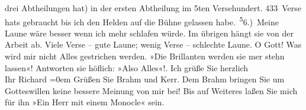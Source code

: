 \begin{ledgroupsized}[t]{13cm}
               drei Abtheilungen hat) in der ersten Abtheilung im 5ten Versehundert. 433 Verse hats gebraucht bis ich den Helden
               auf die Bühne gelassen habe. \substVorne{}\textsuperscript{5}\substDazwischen{}6\substHinten{}.) Meine Laune wäre besser {\pb}wenn ich mehr schlafen würde. Im übrigen hängt sie von der Arbeit ab. Viele Verse –
               gute Laune; wenig Verse – schlechte Laune. O Gott! Was wird mir nicht Alles
               gestrichen werden. »Die Brillanten werden sie mer stehn lassen«! Antworten sie
               höflich: »Also Alles«!.\pend
           \pstart
            Ich grüße Sie herzlich{\\[\baselineskip]}Ihr \spacefill\mbox{Richard}\pend
           \leftskip=0em{}\pstart
           \noindent{}Grüßen Sie Brahm und Kerr. Dem Brahm bringen Sie um Gotteswillen keine bessere
                  Meinung von mir bei! Bis auf Weiteres laßen Sie mich für ihn »Ein Herr mit einem
                  Monocle« sein.\pend
           \endnumbering{}\end{ledgroupsized}  \newcommand{\dateiname}{L00988}\newcommand{\titel}{Richard Beer-Hofmann an Arthur Schnitzler, 3. 10. 1899}\newcommand{\editorInnen}{Martin Anton Müller und Gerd-Hermann Susen}
      